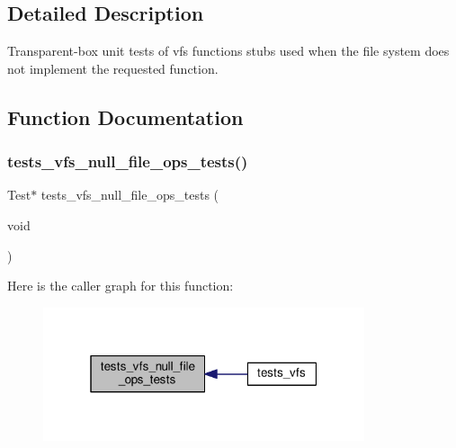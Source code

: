 \subsection{Detailed Description}
Transparent-\/box unit tests of vfs functions stubs used when the file system does not implement the requested function. 



\subsection{Function Documentation}
\mbox{\label{tests-vfs-file-ops_8c_aa3c93ba92be080dce73d6ef5688ffb8b}} 
\subsubsection{\texorpdfstring{tests\+\_\+vfs\+\_\+null\+\_\+file\+\_\+ops\+\_\+tests()}{tests\_vfs\_null\_file\_ops\_tests()}}
{\footnotesize\ttfamily Test$\ast$ tests\+\_\+vfs\+\_\+null\+\_\+file\+\_\+ops\+\_\+tests (\begin{DoxyParamCaption}\item[{void}]{ }\end{DoxyParamCaption})}

Here is the caller graph for this function\+:
\nopagebreak
\begin{figure}[H]
\begin{center}
\leavevmode
\includegraphics[width=268pt]{tests-vfs-file-ops_8c_aa3c93ba92be080dce73d6ef5688ffb8b_icgraph}
\end{center}
\end{figure}
